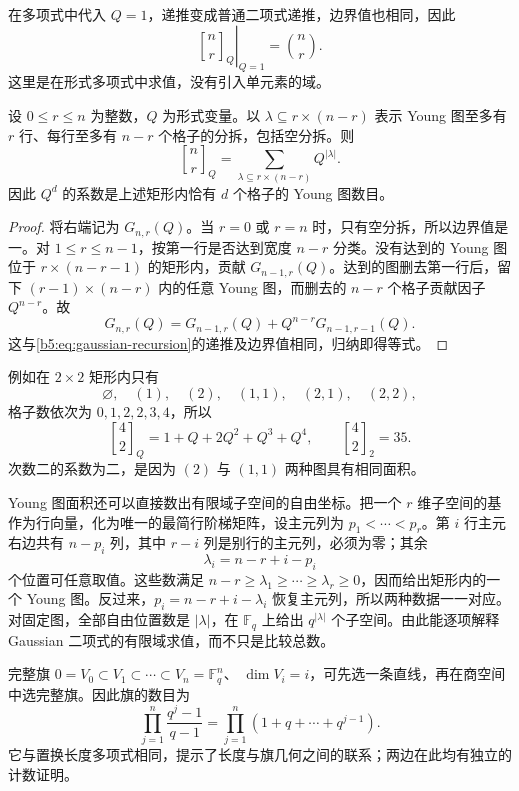 在多项式中代入 \(Q=1\)，递推变成普通二项式递推，边界值也相同，因此
\[
	\left.{n\brack r}_Q\right|_{Q=1}=\binom nr.
\]
这里是在形式多项式中求值，没有引入单元素的域。

\begin{proposition}\label{b5:prop:gaussian-young-area}
	设 \(0\le r\le n\) 为整数，\(Q\) 为形式变量。以 \(\lambda\subseteq r\times(n-r)\) 表示 Young 图至多有 \(r\) 行、每行至多有 \(n-r\) 个格子的分拆，包括空分拆。则
	\[
		{n\brack r}_Q =\sum_{\lambda\subseteq r\times(n-r)}Q^{|\lambda|}.
	\]
	因此 \(Q^d\) 的系数是上述矩形内恰有 \(d\) 个格子的 Young 图数目。
\end{proposition}
\begin{proof}
	将右端记为 \(G_{n,r}(Q)\)。当 \(r=0\) 或 \(r=n\) 时，只有空分拆，所以边界值是一。对 \(1\le r\le n-1\)，按第一行是否达到宽度 \(n-r\) 分类。没有达到的 Young 图位于 \(r\times(n-r-1)\) 的矩形内，贡献 \(G_{n-1,r}(Q)\)。达到的图删去第一行后，留下 \((r-1)\times(n-r)\) 内的任意 Young 图，而删去的 \(n-r\) 个格子贡献因子 \(Q^{n-r}\)。故
	\[
		G_{n,r}(Q)=G_{n-1,r}(Q)+Q^{n-r}G_{n-1,r-1}(Q).
	\]
	这与\eqref{b5:eq:gaussian-recursion}的递推及边界值相同，归纳即得等式。
\end{proof}

例如在 \(2\times2\) 矩形内只有
\[
	\varnothing,\quad(1),\quad(2),\quad(1,1),\quad(2,1),\quad(2,2),
\]
格子数依次为 \(0,1,2,2,3,4\)，所以
\[
	{4\brack2}_Q=1+Q+2Q^2+Q^3+Q^4, \qquad {4\brack2}_2=35.
\]
次数二的系数为二，是因为 \((2)\) 与 \((1,1)\) 两种图具有相同面积。

\ProseParagraphBreak
Young 图面积还可以直接数出有限域子空间的自由坐标。把一个 \(r\) 维子空间的基作为行向量，化为唯一的最简行阶梯矩阵，设主元列为 \(p_1<\cdots<p_r\)。第 \(i\) 行主元右边共有 \(n-p_i\) 列，其中 \(r-i\) 列是别行的主元列，必须为零；其余
\[
	\lambda_i=n-r+i-p_i
\]
个位置可任意取值。这些数满足 \(n-r\ge\lambda_1\ge\cdots\ge\lambda_r\ge0\)，因而给出矩形内的一个 Young 图。反过来，\(p_i=n-r+i-\lambda_i\) 恢复主元列，所以两种数据一一对应。对固定图，全部自由位置数是 \(|\lambda|\)，在 \(\mathbb F_q\) 上给出 \(q^{|\lambda|}\) 个子空间。由此能逐项解释 Gaussian 二项式的有限域求值，而不只是比较总数。

\ProseParagraphBreak
完整旗 \(0=V_0\subset V_1\subset\cdots\subset V_n=\mathbb F_q^n\)、 \(\dim V_i=i\)，可先选一条直线，再在商空间中选完整旗。因此旗的数目为
\[
	\prod_{j=1}^n\frac{q^j-1}{q-1} =\prod_{j=1}^n(1+q+\cdots+q^{j-1}).
\]
它与置换长度多项式相同，提示了长度与旗几何之间的联系；两边在此均有独立的计数证明。

